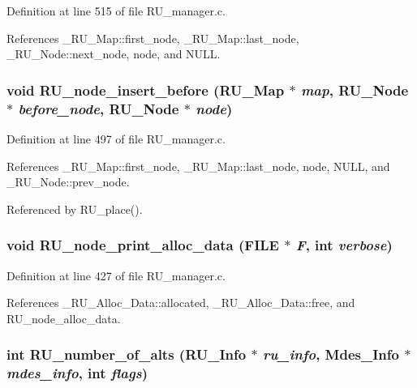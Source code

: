 Definition at line 515 of file RU\_\-manager.c.

References \_\-RU\_\-Map::first\_\-node, \_\-RU\_\-Map::last\_\-node, \_\-RU\_\-Node::next\_\-node, node, and NULL.
\subsubsection{\setlength{\rightskip}{0pt plus 5cm}void RU\_\-node\_\-insert\_\-before (\bf{RU\_\-Map} $\ast$ {\em map}, \bf{RU\_\-Node} $\ast$ {\em before\_\-node}, \bf{RU\_\-Node} $\ast$ {\em node})}\label{RU__manager_8c_6df41a2223c79da7639cc70226e5a44f}




Definition at line 497 of file RU\_\-manager.c.

References \_\-RU\_\-Map::first\_\-node, \_\-RU\_\-Map::last\_\-node, node, NULL, and \_\-RU\_\-Node::prev\_\-node.

Referenced by RU\_\-place().
\subsubsection{\setlength{\rightskip}{0pt plus 5cm}void RU\_\-node\_\-print\_\-alloc\_\-data (FILE $\ast$ {\em F}, int {\em verbose})}\label{RU__manager_8c_f2144b0c30c68942e20c4d545d53b3af}




Definition at line 427 of file RU\_\-manager.c.

References \_\-RU\_\-Alloc\_\-Data::allocated, \_\-RU\_\-Alloc\_\-Data::free, and RU\_\-node\_\-alloc\_\-data.
\subsubsection{\setlength{\rightskip}{0pt plus 5cm}int RU\_\-number\_\-of\_\-alts (\bf{RU\_\-Info} $\ast$ {\em ru\_\-info}, Mdes\_\-Info $\ast$ {\em mdes\_\-info}, int {\em flags})}\label{RU__manager_8c_2bb3c099a39bca63ac454c2d8bf390c3}




